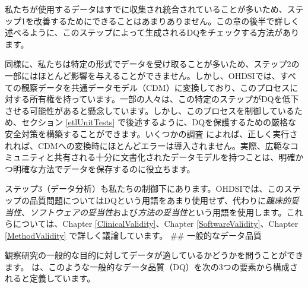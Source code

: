 \documentclass[
  11pt]{book}
\theoremstyle{definition}
\theoremstyle{definition}
\theoremstyle{definition}
\theoremstyle{definition}
\theoremstyle{remark}
\begin{document}
私たちが使用するデータはすでに収集され統合されていることが多いため、ステップ1を改善するためにできることはあまりありません。この章の後半で詳しく述べるように、このステップによって生成されるDQをチェックする方法があります。

同様に、私たちは特定の形式でデータを受け取ることが多いため、ステップ2の一部にはほとんど影響を与えることができません。しかし、OHDSIでは、すべての観察データを共通データモデル（CDM）に変換しており、このプロセスに対する所有権を持っています。一部の人々は、この特定のステップがDQを低下させる可能性があると懸念しています。しかし、このプロセスを制御しているため、セクション \ref{etlUnitTests} で後述するように、DQを保護するための厳格な安全対策を構築することができます。いくつかの調査 \citep{defalco_2013, makadia_2014, matcho_2014, voss_2015, voss_2015b, hripcsak_2018} によれば、正しく実行されれば、CDMへの変換時にほとんどエラーは導入されません。実際、広範なコミュニティと共有される十分に文書化されたデータモデルを持つことは、明確かつ明確な方法でデータを保存するのに役立ちます。

ステップ3（データ分析）も私たちの制御下にあります。OHDSIでは、このステップの品質問題についてはDQという用語をあまり使用せず、代わりに\emph{臨床的妥当性}、\emph{ソフトウェアの妥当性}および\emph{方法の妥当性}という用語を使用します。これらについては、Chapter \ref{ClinicalValidity}、Chapter \ref{SoftwareValidity}、Chapter \ref{MethodValidity} で詳しく議論しています。 \#\# 一般的なデータ品質

観察研究の一般的な目的に対してデータが適しているかどうかを問うことができます。\citet{kahn_harmonized_2016} は、このような一般的なデータ品質（DQ）を次の3つの要素から構成されると定義しています。
\end{document}
